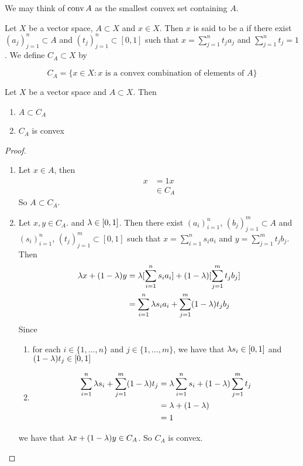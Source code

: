 \documentclass{book}
\begin{document}
	\begin{note}
		We may think of $\operatorname{conv} A$ as the smallest convex set containing $A$. 
	\end{note}

	\begin{defn}
		Let $X$ be a vector space, $A \subset X$ and $x \in X$. Then $x$ is said to be a  if there exist $(a_j)_{j=1}^n \subset A$ and $(t_j)_{j=1}^n \subset [0,1]$ such that $x = \sum\limits_{j=1}^n t_j a_j$ and $\sum\limits_{j=1}^n t_j = 1$. We define $C_A \subset X$ by 
		
		$$C_A = \{x \in X:\text{$x$ is a convex combination of elements of $A$}\}$$
	\end{defn}

	\begin{ex}
		Let $X$ be a vector space and $A \subset X$. 
 		Then 
 		\begin{enumerate}
 			\item $A \subset C_A$
 			\item $C_A$ is convex 
 		\end{enumerate}
	\end{ex}

	\begin{proof}\
		\begin{enumerate}
			\item Let $x \in A$, then 
			\begin{align*}
				x 
				&= 1x \\
				& \in C_A 
			\end{align*}
			So $A \subset C_A$.\\
			\item Let $x, y \in C_A$. and $\lambda \in [0,1]$. Then there exist $(a_i)_{i=1}^n$, $(b_j)_{j=1}^m \subset A$ and $(s_i)_{i=1}^n$, $(t_j)_{j=1}^m \subset [0,1]$ such that $x = \sum\limits_{i=1}^n s_i a_i$ and $y = \sum\limits_{j=1}^m t_j b_j$. Then
			\begin{align*}
				\lambda x + (1-\lambda)y 
				&= \lambda [\sum\limits_{i=1}^n s_i a_i] + (1-\lambda)[\sum\limits_{j=1}^m t_j b_j] \\
				&= \sum\limits_{i=1}^n \lambda s_i a_i + \sum\limits_{j=1}^m (1-\lambda) t_j b_j
			\end{align*}
			Since 
			\begin{enumerate}
				\item for each $i \in \{1, \ldots, n\}$ and $j \in \{1, \ldots, m\}$, we have that $\lambda s_i \in [0,1]$ and $(1-\lambda)t_j \in [0,1]$
				\item 
				\begin{align*}
					\sum\limits_{i=1}^n \lambda s_i + \sum\limits_{j=1}^m (1-\lambda) t_j
					&= \lambda \sum\limits_{i=1}^n s_i +  (1-\lambda) \sum\limits_{j=1}^m  t_j \\
					&= \lambda + (1-\lambda) \\
					&= 1
				\end{align*}
			\end{enumerate}
			we have that $\lambda x+(1-\lambda) y \in C_A$. So $C_A$ is convex.
		\end{enumerate}
	\end{proof}
\end{document}
